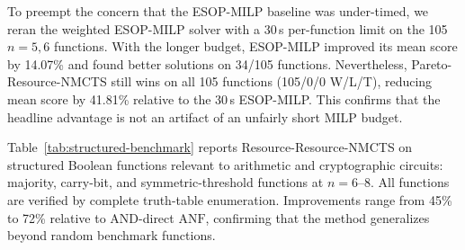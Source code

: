 \documentclass[11pt]{article}
\newcommand{\method}{Resource-NMCTS}
\newcommand{\anf}{\ensuremath{\mathrm{ANF}}}
\begin{document}
To preempt the concern that the ESOP-MILP baseline was under-timed, we reran
the weighted ESOP-MILP solver with a 30\,s per-function limit on the 105
$n=5,6$ functions.  With the longer budget, ESOP-MILP improved its mean score
by 14.07\% and found better solutions on 34/105 functions.  Nevertheless,
Pareto-\method{} still wins on all 105 functions (105/0/0 W/L/T), reducing mean
score by 41.81\% relative to the 30\,s ESOP-MILP.  This confirms that the
headline advantage is not an artifact of an unfairly short MILP budget.

Table~\ref{tab:structured-benchmark} reports Resource-\method{} on structured
Boolean functions relevant to arithmetic and cryptographic circuits:
majority, carry-bit, and symmetric-threshold functions at $n=6$--$8$.  All
functions are verified by complete truth-table enumeration.  Improvements
range from 45\% to 72\% relative to AND-direct \anf{}, confirming that the
method generalizes beyond random benchmark functions.
\end{document}
